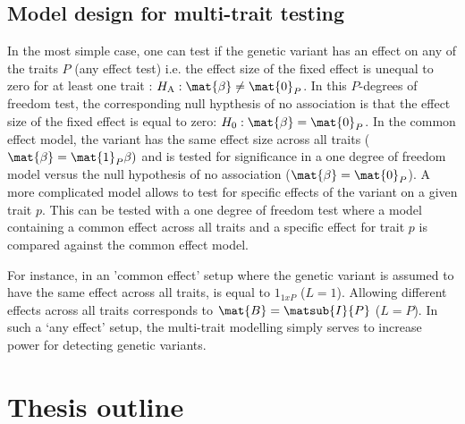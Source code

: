 \subsection{Model design for multi-trait testing}
\label{subsection:model-design}
In the most simple case, one can test if the genetic variant has an effect on any of the traits \(P\) (any effect test) i.e. the effect size of the fixed effect is unequal to zero for at least one trait : \(H_\text{A}: \mat{\beta} \ne \mat{0}_P\).  In this \(P\)-degrees of freedom test, the corresponding null hypthesis of no association is that the effect size of the fixed effect is equal to zero: \(H_0:\mat{\beta}  = \mat{0}_P\). In the common effect model, the variant has the same effect size across all traits (\(\mat{\beta}  = \mat{1}_P\beta)\) and is tested for significance in a one degree of freedom model versus the null hypothesis of no association (\(\mat{\beta}  = \mat{0}_P\)). A more complicated model allows to test for specific effects of the variant on a given trait \(p\). This can be tested with a one degree of freedom test where a model containing a common effect across all traits and a specific effect for trait \(p\) is compared against the common effect model.

For instance, in an 'common effect' setup where the genetic variant is assumed to have the same effect across all traits,   is equal to \(1_{1xP}\) (\(L=1\)). Allowing different effects across all traits corresponds to  \( \mat{B} =  \matsub{I}{P} \) (\(L=P\)). In such a `any effect' setup, the multi-trait modelling simply serves to increase power for detecting genetic variants. 

\section{Thesis outline}
